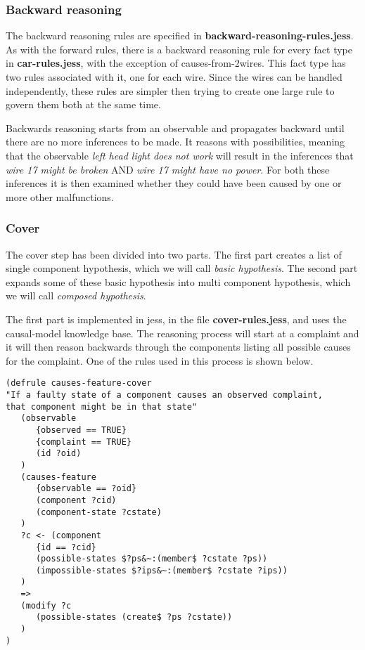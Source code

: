 \subsubsection{Backward reasoning}
The backward reasoning rules are specified in \textbf{backward-reasoning-rules.jess}. As with the forward rules, there is a backward reasoning rule for every fact type in \textbf{car-rules.jess}, with the exception of causes-from-2wires. This fact type has two rules associated with it, one for each wire. Since the wires can be handled independently, these rules are simpler then trying to create one large rule to govern them both at the same time.

Backwards reasoning starts from an observable and propagates backward until there are no more inferences to be made. It reasons with possibilities, meaning that the observable \emph{left head light does not work} will result in the inferences that \emph{wire 17 might be broken} AND \emph{wire 17 might have no power}. For both these inferences it is then examined whether they could have been caused by one or more other malfunctions. 

\subsubsection{Cover}
The cover step has been divided into two parts. The first part creates a list of single component hypothesis, which we will call \emph{basic hypothesis}. The second part expands some of these basic hypothesis into multi component hypothesis, which we will call \emph{composed hypothesis}.

The first part is implemented in jess, in the file \textbf{cover-rules.jess}, and uses the causal-model knowledge base. The reasoning process will start at a complaint and it will then reason backwards through the components listing all possible causes for the complaint. One of the rules used in this process is shown below.

\begin{verbatim}
(defrule causes-feature-cover
"If a faulty state of a component causes an observed complaint, 
that component might be in that state"
   (observable
      {observed == TRUE}
      {complaint == TRUE}
      (id ?oid)
   )
   (causes-feature
      {observable == ?oid}
      (component ?cid)
      (component-state ?cstate)
   )
   ?c <- (component
      {id == ?cid}
      (possible-states $?ps&~:(member$ ?cstate ?ps))
      (impossible-states $?ips&~:(member$ ?cstate ?ips))
   )
   =>
   (modify ?c
      (possible-states (create$ ?ps ?cstate))
   )
)
\end{verbatim}


